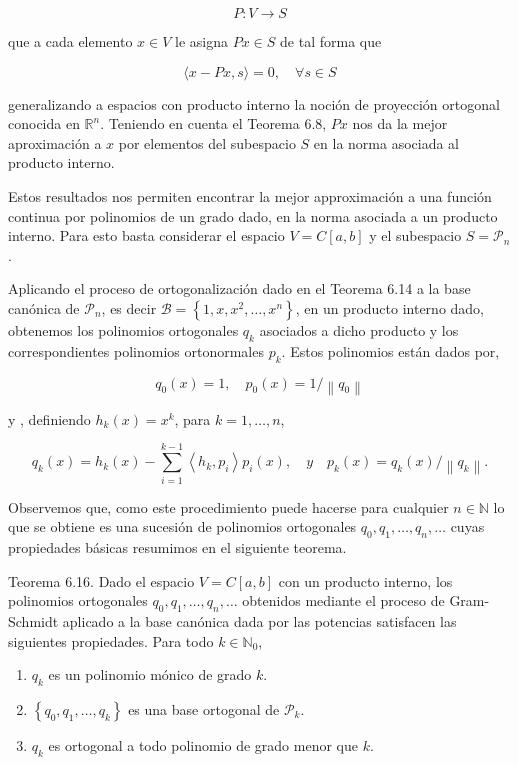 \documentclass[10pt]{article}
\begin{document}
$$
P: V \longrightarrow S
$$

que a cada elemento $x \in V$ le asigna $P x \in S$ de tal forma que

$$
\langle x-P x, s\rangle=0, \quad \forall s \in S
$$

generalizando a espacios con producto interno la noción de proyección ortogonal conocida en $\mathbb{R}^{n}$. Teniendo en cuenta el Teorema 6.8, $P x$ nos da la mejor aproximación a $x$ por elementos del subespacio $S$ en la norma asociada al producto interno.

Estos resultados nos permiten encontrar la mejor approximación a una función continua por polinomios de un grado dado, en la norma asociada a un producto interno. Para esto basta considerar el espacio $V=C[a, b]$ y el subespacio $S=\mathcal{P}_{n}$.

Aplicando el proceso de ortogonalización dado en el Teorema 6.14 a la base canónica de $\mathcal{P}_{n}$, es decir $\mathcal{B}=\left\{1, x, x^{2}, \ldots, x^{n}\right\}$, en un producto interno dado, obtenemos los polinomios ortogonales $q_{k}$ asociados a dicho producto y los correspondientes polinomios ortonormales $p_{k}$. Estos polinomios están dados por,

$$
q_{0}(x)=1, \quad p_{0}(x)=1 /\left\|q_{0}\right\|
$$

y , definiendo $h_{k}(x)=x^{k}$, para $k=1, \ldots, n$,

$$
q_{k}(x)=h_{k}(x)-\sum_{i=1}^{k-1}\left\langle h_{k}, p_{i}\right\rangle p_{i}(x), \quad y \quad p_{k}(x)=q_{k}(x) /\left\|q_{k}\right\| .
$$

Observemos que, como este procedimiento puede hacerse para cualquier $n \in \mathbb{N}$ lo que se obtiene es una sucesión de polinomios ortogonales $q_{0}, q_{1}, \ldots, q_{n}, \ldots$ cuyas propiedades básicas resumimos en el siguiente teorema.

Teorema 6.16. Dado el espacio $V=C[a, b]$ con un producto interno, los polinomios ortogonales $q_{0}, q_{1}, \ldots, q_{n}, \ldots$ obtenidos mediante el proceso de Gram-Schmidt aplicado a la base canónica dada por las potencias satisfacen las siguientes propiedades. Para todo $k \in \mathbb{N}_{0}$,

\begin{enumerate}
  \item $q_{k}$ es un polinomio mónico de grado $k$.
  \item $\left\{q_{0}, q_{1}, \ldots, q_{k}\right\}$ es una base ortogonal de $\mathcal{P}_{k}$.
  \item $q_{k}$ es ortogonal a todo polinomio de grado menor que $k$.
\end{enumerate}
\end{document}
